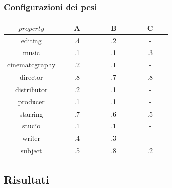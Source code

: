 \documentclass{beamer}
\begin{document}

\begin{frame}
\frametitle{Configurazioni dei pesi}

\begin{center}
\begin{tabular}{c | ccc}
        \toprule
        $property$ & ~~~A~~~ & ~~~B~~~ & ~~~C~~~ \\
        \hline
        editing			& .4 & .2 & - \\
        music			& .1 & .1 & .3 \\
        cinematography 	& .2 & .1 & - \\
        director		& .8 & .7 & .8 \\
        distributor 	& .2 & .1 & - \\
        producer		& .1 & .1 & - \\
        starring		& .7 & .6 & .5 \\
        studio			& .1 & .1 & - \\
        writer			& .4 & .3 & - \\
        subject			& .5 & .8 & .2 \\
        \bottomrule
        \end{tabular}
\end{center}
\end{frame}

\subsection{Risultati}
\end{document}
